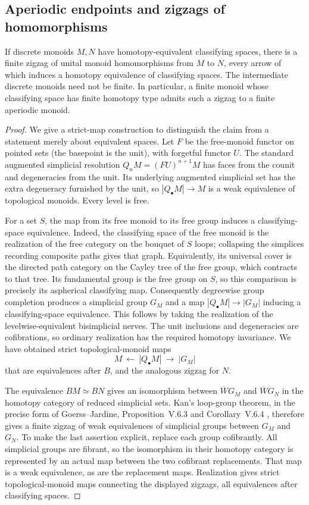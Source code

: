 \subsection{Aperiodic endpoints and zigzags of homomorphisms}
\begin{proposition}\label{prop:B-zigzag}
If discrete monoids $M,N$ have homotopy-equivalent classifying spaces,
there is a finite zigzag of unital monoid homomorphisms from $M$ to
$N$, every arrow of which induces a homotopy equivalence of
classifying spaces.  The intermediate discrete monoids need not be
finite.  In particular, a finite monoid whose classifying space has
finite homotopy type admits such a zigzag to a finite aperiodic monoid.
\end{proposition}
\begin{proof}
We give a strict-map construction to distinguish the claim from a
statement merely about equivalent spaces.  Let $F$ be the free-monoid
functor on pointed sets (the basepoint is the unit), with forgetful
functor $U$.  The standard augmented simplicial resolution
$Q_nM=(FU)^{n+1}M$ has faces from the counit and degeneracies from
the unit.  Its underlying augmented simplicial set has the extra
degeneracy furnished by the unit, so $|Q_\bullet M|\to M$ is a
weak equivalence of topological monoids.  Every level is free.

For a set $S$, the map from its free monoid to its free group induces
a classifying-space equivalence.  Indeed, the classifying space of the
free monoid is the realization of the free category on the bouquet of
$S$ loops; collapsing the simplices recording composite paths gives
that graph.  Equivalently, its universal cover is the directed path
category on the Cayley tree of the free group, which contracts to that
tree.  Its fundamental group is the free group on $S$, so this
comparison is precisely its aspherical classifying map.
Consequently degreewise group completion produces a simplicial group
$G_M$ and a map
$|Q_\bullet M|\to|G_M|$ inducing a classifying-space equivalence.
This follows by taking the realization of the levelwise-equivalent
bisimplicial nerves.  The unit inclusions and degeneracies are
cofibrations, so ordinary realization has the required homotopy
invariance.  We have obtained strict topological-monoid maps
\[
 M\ \longleftarrow\ |Q_\bullet M|\ \longrightarrow\ |G_M|
\]
that are equivalences after $B$, and the analogous zigzag for $N$.

The equivalence $BM\simeq BN$ gives an isomorphism between
$\overline W G_M$ and $\overline W G_N$ in the homotopy category
of reduced simplicial sets.  Kan's loop-group theorem, in the precise
form of Goerss--Jardine, Proposition~V.6.3 and Corollary~V.6.4
\cite{GoerssJardine1999B},
therefore gives a finite zigzag of weak equivalences of simplicial
groups between $G_M$ and $G_N$.  To make the last assertion explicit,
replace each group cofibrantly.  All simplicial groups are fibrant,
so the isomorphism in their homotopy category is represented by an
actual map between the two cofibrant replacements.  That map is a
weak equivalence, as are the replacement maps.  Realization gives
strict topological-monoid maps connecting the displayed zigzags,
all equivalences after classifying spaces.


\end{proof}
